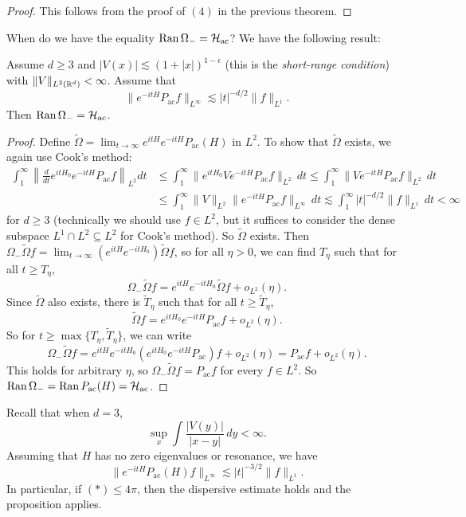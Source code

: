 \begin{proof}
  This follows from the proof of $(4)$ in the
  previous theorem.
\end{proof}

\begin{remark}
  When do we have the equality
  $\operatorname{Ran} \Omega_- = \mathcal{H}_{\mathrm{ac}}$? We have the following
  result:
\end{remark}

\begin{prop}
  Assume $d \ge 3$ and $|V(x)| \lesssim (1 + |x|)^{1 - \epsilon}$ (this is the \emph{short-range condition})
  with $\|V\|_{L^2(\mathbb{R}^d)} < \infty$. Assume that
  \[
    \|e^{-itH}P_{\mathrm{ac}} f \|_{L^\infty}
    \lesssim |t|^{-d / 2} \|f\|_{L^1}.
  \]
  Then $\operatorname{Ran} \Omega_- = \mathcal{H}_{\mathrm{ac}}$.
\end{prop}

\begin{proof}
  Define $\widetilde{\Omega} = \lim_{t \to \infty} e^{itH} e^{-itH} P_{\mathrm{ac}}(H)$ in $L^2$.
  To show that $\widetilde{\Omega}$ exists, we
  again use Cook's method:
  \begin{align*}
    \int_1^\infty \left\| \frac{d}{dt} e^{itH_0} e^{-itH} P_{\mathrm{ac}} f \right\|_{L^2} dt
    &\le \int_1^\infty \| e^{itH_0} V e^{-itH} P_{\mathrm{ac}} f \|_{L^2}\, dt
    \le \int_1^\infty \| V e^{-itH} P_{\mathrm{ac}} f \|_{L^2}\, dt \\
    &\le
    \int_1^\infty \| V \|_{L^2} \| e^{-itH} P_{\mathrm{ac}} f \|_{L^\infty}\, dt
    \lesssim \int_1^\infty |t|^{-d / 2} \|f\|_{L^1}\, dt < \infty
  \end{align*}
  for $d \ge 3$ (technically we should use
  $f \in L^2$, but it suffices to consider the
  dense subspace $L^1 \cap L^2 \subseteq L^2$ for
  Cook's method).
  So $\widetilde{\Omega}$ exists. Then
  $\Omega_- \widetilde{\Omega} f = \lim_{t \to \infty} (e^{itH} e^{-itH_0}) \widetilde{\Omega} f$, so
  for all $\eta > 0$, we can find $T_\eta$ such
  that for all $t \ge T_\eta$,
  \[
    \Omega_- \widetilde{\Omega} f
    = e^{itH} e^{-itH_0} \widetilde{\Omega} f
    + o_{L^2}(\eta).
  \]
  Since $\widetilde{\Omega}$ also exists,
  there is $\widetilde{T}_\eta$ such that
  for all $t \ge \widetilde{T}_\eta$,
  \[
    \widetilde{\Omega} f
    = e^{itH_0} e^{-itH}
    P_{\mathrm{ac}} f + o_{L^2}(\eta).  
  \]
  So for $t \ge \max\{T_\eta, \widetilde{T}_\eta\}$,
  we can write
  \[
    \Omega_- \widetilde{\Omega} f
    = e^{itH} e^{-itH_0} (e^{itH_0} e^{-itH} P_{\mathrm{ac}}) f + o_{L^2}(\eta)
    = P_{\mathrm{ac}} f + o_{L^2}(\eta).
  \]
  This holds for arbitrary $\eta$, so
  $\Omega_- \widetilde{\Omega} f = P_{\mathrm{ac}} f$
  for every $f \in L^2$. So
  $\operatorname{Ran} \Omega_- = \operatorname{Ran} P_{\mathrm{ac}}(H) = \mathcal{H}_{\mathrm{ac}}$.
\end{proof}

\begin{remark}
  Recall that when $d = 3$,
  \[
    \sup_x \int \frac{|V(y)|}{|x - y|}\, dy
    < \infty. \tag{$*$}
  \]
  Assuming that $H$ has no zero eigenvalues or
  resonance, we have
  \[
    \|e^{-itH} P_{\mathrm{ac}}(H) f\|_{L^\infty}
    \lesssim |t|^{-3 / 2} \|f\|_{L^1}.
  \]
  In particular, if $(*) \le 4\pi$,
  then the dispersive estimate holds and
  the proposition applies.
\end{remark}
